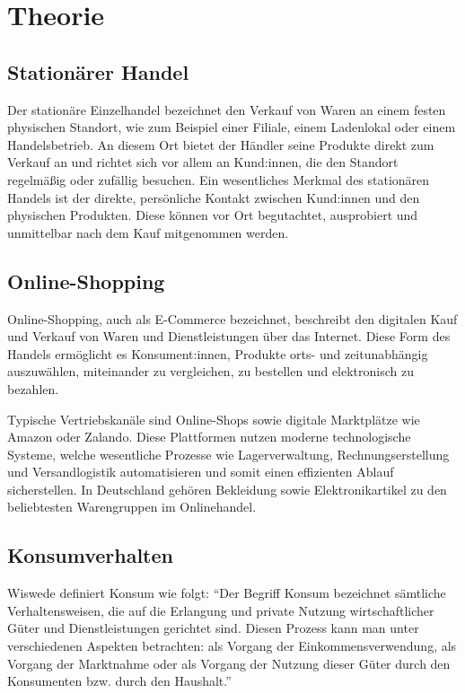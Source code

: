\section{Theorie}
\subsection{Stationärer Handel}
Der stationäre Einzelhandel bezeichnet den Verkauf von Waren an einem festen physischen Standort, wie zum Beispiel einer Filiale, einem Ladenlokal oder einem Handelsbetrieb. An diesem Ort bietet der Händler seine Produkte direkt zum Verkauf an und richtet sich vor allem an Kund:innen, die den Standort regelmäßig oder zufällig besuchen. Ein wesentliches Merkmal des stationären Handels ist der direkte, persönliche Kontakt zwischen Kund:innen und den physischen Produkten. Diese können vor Ort begutachtet, ausprobiert und unmittelbar nach dem Kauf mitgenommen werden.

\subsection{Online-Shopping}
Online-Shopping, auch als E-Commerce bezeichnet, beschreibt den digitalen Kauf und Verkauf von Waren und Dienstleistungen über das Internet. Diese Form des Handels ermöglicht es Konsument:innen, Produkte orts- und zeitunabhängig auszuwählen, miteinander zu vergleichen, zu bestellen und elektronisch zu bezahlen. 

Typische Vertriebskanäle sind Online-Shops sowie digitale Marktplätze wie Amazon oder Zalando. Diese Plattformen nutzen moderne technologische Systeme, welche wesentliche Prozesse wie Lagerverwaltung, Rechnungserstellung und Versandlogistik automatisieren und somit einen effizienten Ablauf sicherstellen. In Deutschland gehören Bekleidung sowie Elektronikartikel zu den beliebtesten Warengruppen im Onlinehandel.

\subsection{Konsumverhalten}
Wiswede definiert Konsum wie folgt: 
\enquote{Der Begriff Konsum bezeichnet sämtliche Verhaltensweisen, die auf die Erlangung und private Nutzung wirtschaftlicher Güter und Dienstleistungen gerichtet sind. Diesen Prozess kann man unter verschiedenen Aspekten betrachten: als Vorgang der Einkommensverwendung, als Vorgang der Marktnahme oder als Vorgang der Nutzung dieser Güter durch den Konsumenten bzw. durch den Haushalt.}

